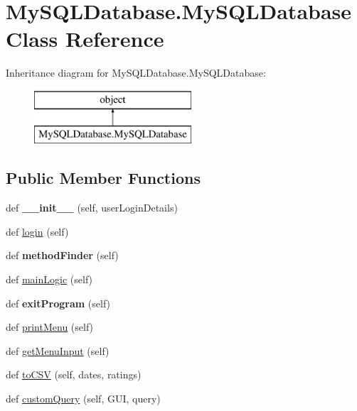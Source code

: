 \hypertarget{class_my_s_q_l_database_1_1_my_s_q_l_database}{}\section{My\+S\+Q\+L\+Database.\+My\+S\+Q\+L\+Database Class Reference}
\label{class_my_s_q_l_database_1_1_my_s_q_l_database}
Inheritance diagram for My\+S\+Q\+L\+Database.\+My\+S\+Q\+L\+Database\+:\begin{figure}[H]
\begin{center}
\leavevmode
\includegraphics[height=2.000000cm]{class_my_s_q_l_database_1_1_my_s_q_l_database}
\end{center}
\end{figure}
\subsection*{Public Member Functions}
\begin{DoxyCompactItemize}
\item 
\hypertarget{class_my_s_q_l_database_1_1_my_s_q_l_database_ad83ed0d272a4c0c7949306cdcdfee5c3}{}\label{class_my_s_q_l_database_1_1_my_s_q_l_database_ad83ed0d272a4c0c7949306cdcdfee5c3} 
def {\bfseries \+\_\+\+\_\+init\+\_\+\+\_\+} (self, user\+Login\+Details)
\item 
def \hyperlink{class_my_s_q_l_database_1_1_my_s_q_l_database_ac9c6bc35283d4bfeacf4394937c625de}{login} (self)
\item 
\hypertarget{class_my_s_q_l_database_1_1_my_s_q_l_database_a1a94c4c47c41d928c10aa1e759d960b1}{}\label{class_my_s_q_l_database_1_1_my_s_q_l_database_a1a94c4c47c41d928c10aa1e759d960b1} 
def {\bfseries method\+Finder} (self)
\item 
def \hyperlink{class_my_s_q_l_database_1_1_my_s_q_l_database_a0fbc0754105eb3364e880b20c384a8dd}{main\+Logic} (self)
\item 
\hypertarget{class_my_s_q_l_database_1_1_my_s_q_l_database_ae5aafab03293ac07bd93a42cd7dbe2bf}{}\label{class_my_s_q_l_database_1_1_my_s_q_l_database_ae5aafab03293ac07bd93a42cd7dbe2bf} 
def {\bfseries exit\+Program} (self)
\item 
def \hyperlink{class_my_s_q_l_database_1_1_my_s_q_l_database_a3350d0f83d2d015b46bba5c0358a540d}{print\+Menu} (self)
\item 
def \hyperlink{class_my_s_q_l_database_1_1_my_s_q_l_database_a01cc9f1c3e782ada4c437682ae31c14c}{get\+Menu\+Input} (self)
\item 
def \hyperlink{class_my_s_q_l_database_1_1_my_s_q_l_database_ac7c560ff26c7d9295c4632385f61ce6d}{to\+C\+SV} (self, dates, ratings)
\item 
def \hyperlink{class_my_s_q_l_database_1_1_my_s_q_l_database_a746a62e1c7d7b11e7f00bbcbd92ed860}{custom\+Query} (self, G\+UI, query)
\end{DoxyCompactItemize}
